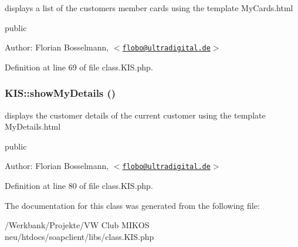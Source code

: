 displays a list of the customers member cards using the template MyCards.html

public \begin{Desc}
\item[Author:]Florian Bosselmann, $<$\href{mailto:flobo@ultradigital.de}{\tt flobo@ultradigital.de}$>$ \end{Desc}


Definition at line 69 of file class.KIS.php.\hypertarget{class_k_i_s_889d57cd0b4360c4e4b48fce626b19cb}{
\subsubsection{\setlength{\rightskip}{0pt plus 5cm}KIS::showMyDetails ()}}
\label{class_k_i_s_889d57cd0b4360c4e4b48fce626b19cb}


displays the customer details of the current customer using the template MyDetails.html

public \begin{Desc}
\item[Author:]Florian Bosselmann, $<$\href{mailto:flobo@ultradigital.de}{\tt flobo@ultradigital.de}$>$ \end{Desc}


Definition at line 80 of file class.KIS.php.

The documentation for this class was generated from the following file:\begin{CompactItemize}
\item 
/Werkbank/Projekte/VW Club MIKOS neu/htdocs/soapclient/libs/class.KIS.php\end{CompactItemize}
